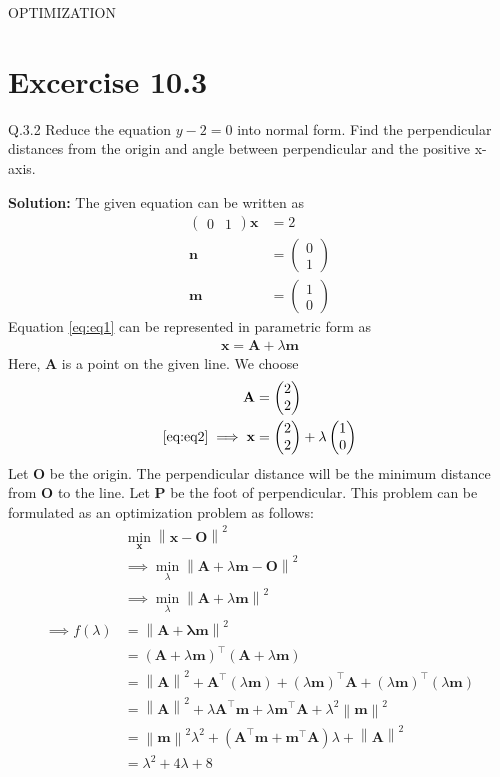 \documentclass[12pt]{article}
\providecommand{\brak}[1]{\ensuremath{\left(#1\right)}}
\providecommand{\norm}[1]{\left\lVert#1\right\rVert}
\newcommand{\solution}{\noindent \textbf{Solution: }}
\newcommand{\myvec}[1]{\ensuremath{\begin{pmatrix}#1\end{pmatrix}}}
\let\vec\mathbf
\begin{document}
\begin{center}
\textbf\large{OPTIMIZATION}

\end{center}
\section*{Excercise 10.3}

Q.3.2 Reduce the equation $y-2=0$ into normal form. Find the perpendicular distances from the origin and angle between perpendicular and the positive x-axis.

\solution
The given equation can be written as
\begin{align}
	\label{eq:eq1}
	\myvec{0&1}\vec{x} &= 2\\
	\vec{n} &= \myvec{0\\1}\\
	\vec{m} &= \myvec{1\\0}
\end{align}
Equation \eqref{eq:eq1} can be represented in parametric form as
\begin{align}
	\label{eq:eq2}
	\vec{x} = \vec{A}+\lambda\vec{m}
\end{align}
Here, $\vec{A}$ is a point on the given line. We choose
\begin{align}
	\vec{A} &= \myvec{2\\2}\\
	\label{eq:line}
	\eqref{eq:eq2} \implies \vec{x} &= \myvec{2\\2}+\lambda\myvec{1\\0}
\end{align}
Let $\vec{O}$ be the origin. The perpendicular distance will be the minimum distance from $\vec{O}$ to the line. Let $\vec{P}$ be the foot of perpendicular. This problem can be formulated as an optimization problem as follows:
\begin{align}
	& \min_{\vec{x}}\norm{\vec{x}-\vec{O}}^2\\
	& \implies \min_{\lambda}\norm{\vec{A}+\lambda\vec{m}-\vec{O}}^2\\
	& \implies \min_{\lambda}\norm{\vec{A}+\lambda\vec{m}}^2\\
	\implies f\brak{\lambda} &= \norm{\vec{A+\lambda\vec{m}}}^2\\
	&= \brak{\vec{A}+\lambda\vec{m}}^\top\brak{\vec{A}+\lambda\vec{m}}\\
	&= \norm{\vec{A}}^2+\vec{A}^\top\brak{\lambda\vec{m}}+\brak{\lambda\vec{m}}^\top\vec{A}+\brak{\lambda\vec{m}}^\top\brak{\lambda\vec{m}}\\
	&= \norm{\vec{A}}^2+\lambda\vec{A}^\top\vec{m}+\lambda\vec{m}^\top\vec{A}+\lambda^2\norm{\vec{m}}^2\\
	&= \norm{\vec{m}}^2\lambda^2+\brak{\vec{A}^\top\vec{m}+\vec{m}^\top\vec{A}}\lambda+\norm{\vec{A}}^2\\
	\label{eq:eq3}
	&= \lambda^2+4\lambda+8
\end{align}
\end{document}
